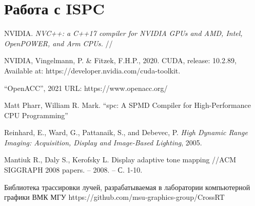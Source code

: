 \documentclass[11pt,fleqn,english,russian]{report} %
\begin{document}
\chapter{Работа с ISPC}


\begin{thebibliography}{10}
	
	 NVIDIA. \textit{NVC++: a C++17 compiler for NVIDIA GPUs and AMD, Intel, OpenPOWER, and Arm CPUs.} // 	
	
	 NVIDIA, Vingelmann, P. \& Fitzek, F.H.P., 2020. CUDA, release: 10.2.89, Available at: https://developer.nvidia.com/cuda-toolkit.	
	
	 ``OpenACC'', 2021 URL: https://www.openacc.org/
	
	 Matt Pharr, William R. Mark. ``spc: A SPMD Compiler for High-Performance CPU Programming''
	
	 Reinhard, E., Ward, G., Pattanaik, S., and Debevec, P. \textit{High Dynamic Range Imaging: Acquisition, Display and Image-Based Lighting}, 2005.
	
	 Mantiuk R., Daly S., Kerofsky L. Display adaptive tone mapping //ACM SIGGRAPH 2008 papers. – 2008. – С. 1-10.
	
	 Библиотека трассировки лучей, разрабатываемая в лаборатории компьютерной графики ВМК МГУ https://github.com/msu-graphics-group/CrossRT
	
\end{thebibliography}
\end{document}
